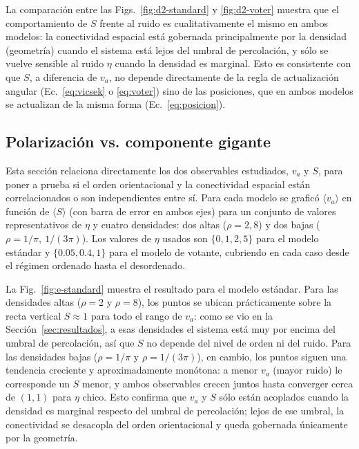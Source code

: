 \documentclass[11pt,a4paper]{article}
\begin{document}
La comparación entre las Figs.~\ref{fig:d2-standard} y
\ref{fig:d2-voter} muestra que el comportamiento de $S$ frente al ruido es
cualitativamente el mismo en ambos modelos: la conectividad espacial está
gobernada principalmente por la densidad (geometría) cuando el sistema
está lejos del umbral de percolación, y sólo se vuelve sensible al ruido
$\eta$ cuando la densidad es marginal. Esto es consistente con que $S$, a
diferencia de $v_a$, no depende directamente de la regla de actualización
angular (Ec.~\eqref{eq:vicsek} o \eqref{eq:voter}) sino de las posiciones,
que en ambos modelos se actualizan de la misma forma
(Ec.~\eqref{eq:posicion}).

\subsection{Polarización vs. componente gigante}

Esta sección relaciona directamente los dos observables estudiados, $v_a$ y
$S$, para poner a prueba si el orden orientacional y la conectividad
espacial están correlacionados o son independientes entre sí. Para cada
modelo se graficó $\langle v_a \rangle$ en función de $\langle S \rangle$
(con barra de error en ambos ejes) para un conjunto de valores
representativos de $\eta$ y cuatro densidades: dos altas ($\rho = 2, 8$) y
dos bajas ($\rho = 1/\pi,\ 1/(3\pi)$). Los valores de $\eta$ usados son
$\{0, 1, 2, 5\}$ para el modelo estándar y $\{0.05, 0.4, 1\}$ para el
modelo de votante, cubriendo en cada caso desde el régimen ordenado hasta
el desordenado.

\begin{center}
\end{center}

La Fig.~\ref{fig:e-standard} muestra el resultado para el modelo estándar.
Para las densidades altas ($\rho = 2$ y $\rho = 8$), los puntos se ubican
prácticamente sobre la recta vertical $S \approx 1$ para todo el rango de
$v_a$: como se vio en la Sección~\ref{sec:resultados}, a esas densidades el
sistema está muy por encima del umbral de percolación, así que $S$ no
depende del nivel de orden ni del ruido. Para las densidades bajas
($\rho = 1/\pi$ y $\rho = 1/(3\pi)$), en cambio, los puntos siguen una
tendencia creciente y aproximadamente monótona: a menor $v_a$ (mayor
ruido) le corresponde un $S$ menor, y ambos observables crecen juntos hasta
converger cerca de $(1,1)$ para $\eta$ chico. Esto confirma que $v_a$ y $S$
sólo están acoplados cuando la densidad es marginal respecto del umbral de
percolación; lejos de ese umbral, la conectividad se desacopla del orden
orientacional y queda gobernada únicamente por la geometría.
\end{document}
